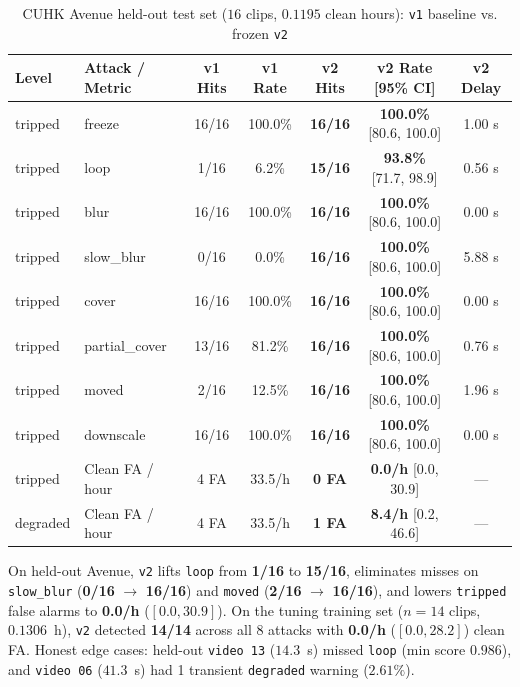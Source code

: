 \documentclass[12pt,a4paper]{article}
\begin{document}
\begin{table}[!ht]
  \centering
  \caption{CUHK Avenue held-out test set ($16$ clips, $0.1195$ clean hours): \texttt{v1} baseline vs. frozen \texttt{v2}}
  \label{tab:avenue_test}
  \begin{tabular}{@{}llccccc@{}}
    \toprule
    \textbf{Level} & \textbf{Attack / Metric} & \textbf{v1 Hits} & \textbf{v1 Rate} & \textbf{v2 Hits} & \textbf{v2 Rate [95\% CI]} & \textbf{v2 Delay} \\
    \midrule
    tripped & freeze & 16/16 & 100.0\% & \textbf{16/16} & \textbf{100.0\%} [80.6, 100.0] & 1.00 s \\
    tripped & loop & 1/16 & 6.2\% & \textbf{15/16} & \textbf{93.8\%} [71.7, 98.9] & 0.56 s \\
    tripped & blur & 16/16 & 100.0\% & \textbf{16/16} & \textbf{100.0\%} [80.6, 100.0] & 0.00 s \\
    tripped & slow\_blur & 0/16 & 0.0\% & \textbf{16/16} & \textbf{100.0\%} [80.6, 100.0] & 5.88 s \\
    tripped & cover & 16/16 & 100.0\% & \textbf{16/16} & \textbf{100.0\%} [80.6, 100.0] & 0.00 s \\
    tripped & partial\_cover & 13/16 & 81.2\% & \textbf{16/16} & \textbf{100.0\%} [80.6, 100.0] & 0.76 s \\
    tripped & moved & 2/16 & 12.5\% & \textbf{16/16} & \textbf{100.0\%} [80.6, 100.0] & 1.96 s \\
    tripped & downscale & 16/16 & 100.0\% & \textbf{16/16} & \textbf{100.0\%} [80.6, 100.0] & 0.00 s \\
    \midrule
    tripped & Clean FA / hour & 4 FA & 33.5/h & \textbf{0 FA} & \textbf{0.0/h} [0.0, 30.9] & --- \\
    degraded & Clean FA / hour & 4 FA & 33.5/h & \textbf{1 FA} & \textbf{8.4/h} [0.2, 46.6] & --- \\
    \bottomrule
  \end{tabular}
\end{table}

On held-out Avenue, \texttt{v2} lifts \texttt{loop} from \textbf{1/16} to \textbf{15/16}, eliminates misses on \texttt{slow\_blur} (\textbf{0/16} $\rightarrow$ \textbf{16/16}) and \texttt{moved} (\textbf{2/16} $\rightarrow$ \textbf{16/16}), and lowers \texttt{tripped} false alarms to \textbf{0.0/h} ($[0.0, 30.9]$). On the tuning training set ($n = 14$ clips, $0.1306$~h), \texttt{v2} detected \textbf{14/14} across all 8 attacks with \textbf{0.0/h} ($[0.0, 28.2]$) clean FA. Honest edge cases: held-out \texttt{video~13} ($14.3$~s) missed \texttt{loop} (min score $0.986$), and \texttt{video~06} ($41.3$~s) had 1 transient \texttt{degraded} warning ($2.61\%$).
\end{document}
